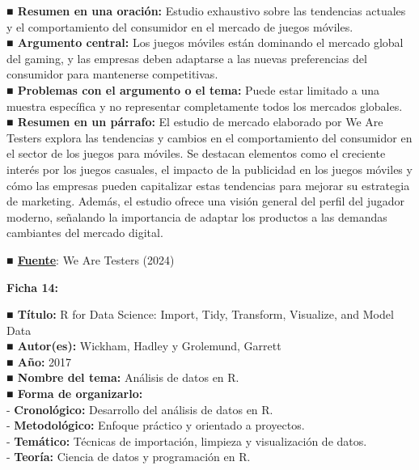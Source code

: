\documentclass[
  letterpaper,
  DIV=11,
  numbers=noendperiod]{scrreprt}
\begin{document}
\textbf{■ Resumen en una oración:} Estudio exhaustivo sobre las
tendencias actuales y el comportamiento del consumidor en el mercado de
juegos móviles.\\
\textbf{■ Argumento central:} Los juegos móviles están dominando el
mercado global del gaming, y las empresas deben adaptarse a las nuevas
preferencias del consumidor para mantenerse competitivas.\\
\textbf{■ Problemas con el argumento o el tema:} Puede estar limitado a
una muestra específica y no representar completamente todos los mercados
globales.\\
\textbf{■ Resumen en un párrafo:} El estudio de mercado elaborado por We
Are Testers explora las tendencias y cambios en el comportamiento del
consumidor en el sector de los juegos para móviles. Se destacan
elementos como el creciente interés por los juegos casuales, el impacto
de la publicidad en los juegos móviles y cómo las empresas pueden
capitalizar estas tendencias para mejorar su estrategia de marketing.
Además, el estudio ofrece una visión general del perfil del jugador
moderno, señalando la importancia de adaptar los productos a las
demandas cambiantes del mercado digital.

\textbf{■
\href{https://www.wearetesters.com/estudios-de-mercado/gaming/}{Fuente}}:
We Are Testers (2024)

\textbf{Ficha 14:}

\textbf{■ Título:} R for Data Science: Import, Tidy, Transform,
Visualize, and Model Data\\
\textbf{■ Autor(es):} Wickham, Hadley y Grolemund, Garrett\\
\textbf{■ Año:} 2017\\
\textbf{■ Nombre del tema:} Análisis de datos en R.\\
\textbf{■ Forma de organizarlo:}\\
- \textbf{Cronológico:} Desarrollo del análisis de datos en R.\\
- \textbf{Metodológico:} Enfoque práctico y orientado a proyectos.\\
- \textbf{Temático:} Técnicas de importación, limpieza y visualización
de datos.\\
- \textbf{Teoría:} Ciencia de datos y programación en R.
\end{document}
